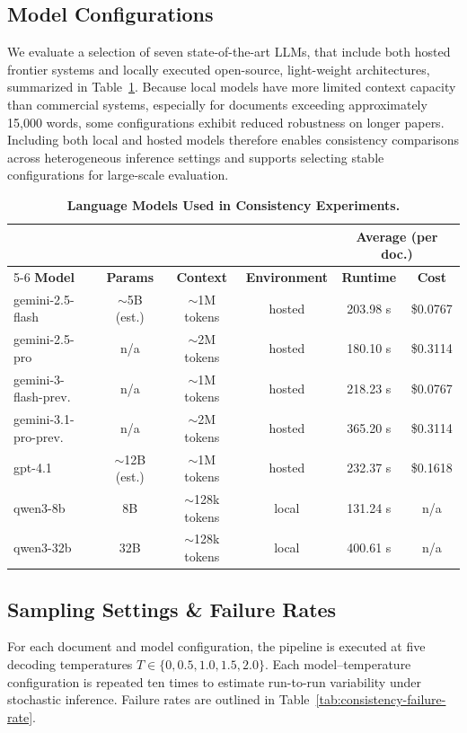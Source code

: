 \documentclass{article}
\begin{document}
    
\subsection{Model Configurations}
We evaluate a selection of seven state-of-the-art LLMs, that include both hosted frontier systems and locally executed open-source, light-weight architectures, summarized in Table~\ref{tab:model-overview}.
Because local models have more limited context capacity than commercial systems, especially for documents exceeding approximately 15{,}000 words, some configurations exhibit reduced robustness on longer papers. 
Including both local and hosted models therefore enables consistency comparisons across heterogeneous inference settings and supports selecting stable configurations for large-scale evaluation.

\begin{table}[!h]
    \centering
    \caption{\textbf{Language Models Used in Consistency Experiments.}}
    \label{tab:model-overview}
    \begin{tabular}{lccccc}
    \toprule
    & & & & \multicolumn{2}{c}{\textbf{Average (per doc.)}} \\
    \cmidrule(lr){5-6}
    \textbf{Model} & \textbf{Params} & \textbf{Context} & \textbf{Environment} & \textbf{Runtime} & \textbf{Cost} \\
    \midrule
    gemini-2.5-flash        & $\sim$5B (est.)  & $\sim$1M tokens  & hosted & 203.98 s & \$0.0767 \\
    gemini-2.5-pro          & n/a              & $\sim$2M tokens  & hosted & 180.10 s & \$0.3114 \\
    gemini-3-flash-prev.    & n/a              & $\sim$1M tokens  & hosted & 218.23 s & \$0.0767 \\
    gemini-3.1-pro-prev.    & n/a              & $\sim$2M tokens  & hosted & 365.20 s & \$0.3114 \\
    gpt-4.1                 & $\sim$12B (est.) & $\sim$1M tokens  & hosted & 232.37 s & \$0.1618 \\
    qwen3-8b                & 8B               & $\sim$128k tokens & local  & 131.24 s & n/a \\
    qwen3-32b               & 32B              & $\sim$128k tokens & local  & 400.61 s & n/a \\
    \bottomrule
    \end{tabular}
\end{table}

\subsection{Sampling Settings \& Failure Rates}
For each document and model configuration, the pipeline is executed at five decoding temperatures
$T \in \{0, 0.5, 1.0, 1.5, 2.0\}$.
Each model--temperature configuration is repeated ten times to estimate run-to-run variability under stochastic inference.
Failure rates are outlined in Table~\ref{tab:consistency-failure-rate}.
\end{document}

